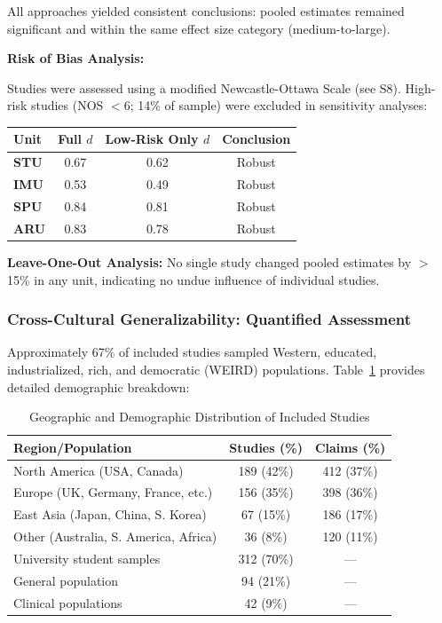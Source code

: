 \documentclass[9pt,onecolumn]{article}
\newcommand{\STU}{\textcolor{stucolor}{\textbf{STU}}}
\newcommand{\IMU}{\textcolor{imucolor}{\textbf{IMU}}}
\newcommand{\SPU}{\textcolor{spucolor}{\textbf{SPU}}}
\newcommand{\ARU}{\textcolor{arucolor}{\textbf{ARU}}}
\begin{document}
All approaches yielded consistent conclusions: pooled estimates remained significant and within the same effect size category (medium-to-large).

\textbf{Risk of Bias Analysis:}

Studies were assessed using a modified Newcastle-Ottawa Scale (see S8). High-risk studies (NOS $< 6$; 14\% of sample) were excluded in sensitivity analyses:

\begin{center}
\small
\begin{tabular}{@{}lccc@{}}
\toprule
\textbf{Unit} & \textbf{Full $d$} & \textbf{Low-Risk Only $d$} & \textbf{Conclusion} \\
\midrule
\STU{} & 0.67 & 0.62 & Robust \\
\IMU{} & 0.53 & 0.49 & Robust \\
\SPU{} & 0.84 & 0.81 & Robust \\
\ARU{} & 0.83 & 0.78 & Robust \\
\bottomrule
\end{tabular}
\end{center}

\textbf{Leave-One-Out Analysis:} No single study changed pooled estimates by $>$15\% in any unit, indicating no undue influence of individual studies.

\subsubsection{Cross-Cultural Generalizability: Quantified Assessment}

Approximately 67\% of included studies sampled Western, educated, industrialized, rich, and democratic (WEIRD) populations. Table~\ref{tab:weird} provides detailed demographic breakdown:

\begin{table}[H]
\centering
\caption{Geographic and Demographic Distribution of Included Studies}
\label{tab:weird}
\small
\begin{tabular}{@{}lcc@{}}
\toprule
\textbf{Region/Population} & \textbf{Studies (\%)} & \textbf{Claims (\%)} \\
\midrule
North America (USA, Canada) & 189 (42\%) & 412 (37\%) \\
Europe (UK, Germany, France, etc.) & 156 (35\%) & 398 (36\%) \\
East Asia (Japan, China, S. Korea) & 67 (15\%) & 186 (17\%) \\
Other (Australia, S. America, Africa) & 36 (8\%) & 120 (11\%) \\
\midrule
University student samples & 312 (70\%) & --- \\
General population & 94 (21\%) & --- \\
Clinical populations & 42 (9\%) & --- \\
\bottomrule
\end{tabular}
\end{table}
\end{document}
